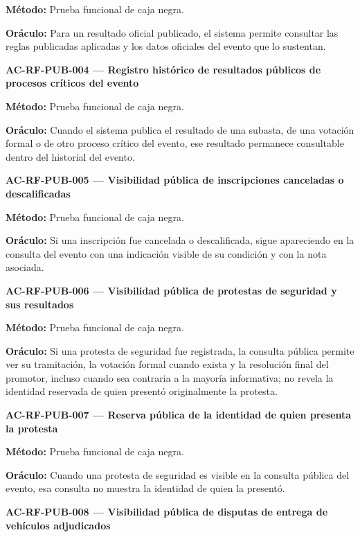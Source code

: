 \documentclass[10pt,letterpaper]{article}
\begin{document}
\textbf{Método:} Prueba funcional de caja negra.\par
\textbf{Oráculo:} Para un resultado oficial publicado, el sistema permite consultar las reglas publicadas aplicadas y los datos oficiales del evento que lo sustentan.\par\vspace{0.45em}
\noindent\textbf{AC-RF-PUB-004 --- Registro histórico de resultados públicos de procesos críticos del evento}\par
\textbf{Método:} Prueba funcional de caja negra.\par
\textbf{Oráculo:} Cuando el sistema publica el resultado de una subasta, de una votación formal o de otro proceso crítico del evento, ese resultado permanece consultable dentro del historial del evento.\par\vspace{0.45em}
\noindent\textbf{AC-RF-PUB-005 --- Visibilidad pública de inscripciones canceladas o descalificadas}\par
\textbf{Método:} Prueba funcional de caja negra.\par
\textbf{Oráculo:} Si una inscripción fue cancelada o descalificada, sigue apareciendo en la consulta del evento con una indicación visible de su condición y con la nota asociada.\par\vspace{0.45em}
\noindent\textbf{AC-RF-PUB-006 --- Visibilidad pública de protestas de seguridad y sus resultados}\par
\textbf{Método:} Prueba funcional de caja negra.\par
\textbf{Oráculo:} Si una protesta de seguridad fue registrada, la consulta pública permite ver su tramitación, la votación formal cuando exista y la resolución final del promotor, incluso cuando sea contraria a la mayoría informativa; no revela la identidad reservada de quien presentó originalmente la protesta.\par\vspace{0.45em}
\noindent\textbf{AC-RF-PUB-007 --- Reserva pública de la identidad de quien presenta la protesta}\par
\textbf{Método:} Prueba funcional de caja negra.\par
\textbf{Oráculo:} Cuando una protesta de seguridad es visible en la consulta pública del evento, esa consulta no muestra la identidad de quien la presentó.\par\vspace{0.45em}
\noindent\textbf{AC-RF-PUB-008 --- Visibilidad pública de disputas de entrega de vehículos adjudicados}\par
\end{document}
